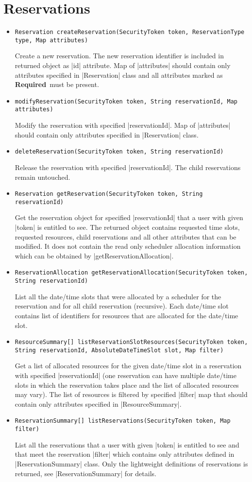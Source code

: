 \documentclass[a4paper]{report}
\newenvironment{Api}{\begin{itemize}}{\end{itemize}}
\newcommand{\ApiCode}[1]{\lstinline[style=styleApi]|#1|}
\newcommand{\ApiItem}[1]{\item #1 %

}
\newcommand{\ApiCmd}[1]{\ApiItem{\ApiCode{#1}}}
\newcommand{\ApiRequired}{{\color{blue!50!black}\textbf{Required}}}
\begin{document}
\section{Reservations}

\begin{Api}

\ApiCmd{Reservation createReservation(SecurityToken token, ReservationType type, Map attributes)}
Create a new reservation. The new reservation identifier is included in returned object as |id| attribute. Map of |attributes| should contain only attributes specified in |Reservation| class and all attributes marked as \ApiRequired\ must be present.

\ApiCmd{modifyReservation(SecurityToken token, String reservationId, Map attributes)}
Modify the reservation with specified |reservationId|. Map of |attributes| should contain only attributes specified in |Reservation| class.

\ApiCmd{deleteReservation(SecurityToken token, String reservationId)}
Release the reservation with specified |reservationId|. The child reservations remain untouched.

\ApiCmd{Reservation getReservation(SecurityToken token, String reservationId)}
Get the reservation object for specified |reservationId| that a user with given |token| is entitled to see. The returned object contains requested time slots, requested resources, child reservations and all other attributes that can be modified. It does not contain the read only scheduler allocation information which can be obtained by |getReservationAllocation|.

\ApiCmd{ReservationAllocation getReservationAllocation(SecurityToken token, String reservationId)}
List all the date/time slots that were allocated by a scheduler for the reservation and for all child reservation (recursive). Each date/time slot contains list of identifiers for resources that are allocated for the date/time slot.

\ApiCmd{ResourceSummary[] listReservationSlotResources(SecurityToken token, String reservationId, AbsoluteDateTimeSlot slot, Map filter)}
Get a list of allocated resources for the given date/time slot in a reservation with specified |reservationId| (one reservation can have multiple date/time slots in which the reservation takes place and the list of allocated resources may vary). The list of resources is filtered by specified |filter| map that should contain only attributes specified in |ResourceSummary|.

\ApiCmd{ReservationSummary[] listReservations(SecurityToken token, Map filter)}
List all the reservations that a user with given |token| is entitled to see and that meet the reservation |filter| which contains only attributes defined in |ReservationSummary| class. Only the lightweight definitions of reservations is returned, see |ReservationSummary| for details.


\end{Api}
\end{document}
